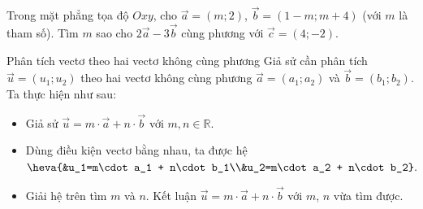\begin{vd}%
	Trong mặt phẳng tọa độ $Oxy$, cho $\vec{a}=(m;2)$, $\vec{b}=(1-m;m+4)$ (với $m$ là tham số). Tìm $m$ sao cho $2\vec{a}-3\vec{b}$ cùng phương với $\vec{c}=(4;-2)$.
\end{vd}
\begin{dang}{Phân tích vectơ theo hai vectơ không cùng phương}
	Giả sử cần phân tích $\vec{u}=(u_1;u_2)$ theo hai vectơ không cùng phương $\vec{a}=(a_1;a_2)$ và $\vec{b}=(b_1;b_2)$. Ta thực hiện như sau:
	\begin{itemize}
		\item [$\bullet$] Giả sử $\vec{u} =m \cdot \vec{a} + n \cdot \vec{b}$ với $m,n \in \mathbb{R}$.
		\item [$\bullet$] Dùng điều kiện vectơ bằng nhau, ta được hệ
		$\heva{&u_1=m\cdot a_1 + n\cdot b_1\\&u_2=m\cdot a_2 + n\cdot b_2}.$
		\item [$\bullet$] Giải hệ trên tìm $m$ và $n$. Kết luận $\vec{u} =m \cdot \vec{a} + n \cdot \vec{b}$ với $m$, $n$ vừa tìm được.
	\end{itemize}
	
\end{dang}
